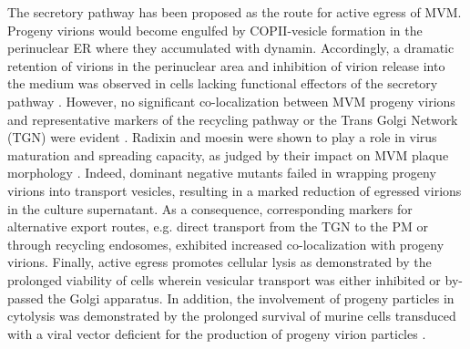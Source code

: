 The secretory pathway has been proposed as the route for active egress of MVM. Progeny virions would become engulfed by COPII-vesicle formation in the perinuclear ER where they accumulated with dynamin. Accordingly, a dramatic retention of virions in the perinuclear area and inhibition of virion release into the medium was observed in cells lacking functional effectors of the secretory pathway \cite{pmid24068925}. However, no significant co-localization between MVM progeny virions and representative markers of the recycling pathway or the Trans Golgi Network (TGN) were evident \cite{pmid24068925}. Radixin and moesin were shown to play a role in virus maturation and spreading capacity, as judged by their impact on MVM plaque morphology \cite{pmid19321616}. Indeed, dominant negative mutants failed in wrapping progeny virions into transport vesicles, resulting in a marked reduction of egressed virions in the culture supernatant. As a consequence, corresponding markers for alternative export routes, e.g. direct transport from the TGN to the PM or through recycling endosomes, exhibited increased co-localization with progeny virions. Finally, active egress promotes cellular lysis as demonstrated by the prolonged viability of cells wherein vesicular transport was either inhibited or by-passed the Golgi apparatus. In addition, the involvement of progeny particles in cytolysis was demonstrated by the prolonged survival of murine cells transduced with a viral vector deficient for the production of progeny virion particles \cite{pmid24068925}.  
\label{Egress1}



  


